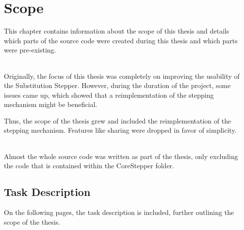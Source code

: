 \chapter{Scope}

This chapter contains information about the scope of this thesis
and details which parts of the source code were created during this thesis and which parts were pre-existing.


\ \\
Originally, the focus of this thesis was completely on improving the usability of the Substitution Stepper.
However, during the duration of the project, some issues came up,
which showed that a reimplementation of the stepping mechanism might be beneficial.

Thus, the scope of the thesis grew and included the reimplementation of the stepping mechanism.
Features like sharing were dropped in favor of simplicity.

\ \\
Almost the whole source code was written as part of the thesis,
only excluding the code that is contained within the CoreStepper folder.

\section{Task Description}
On the following pages, the task description is included,
further outlining the scope of the thesis.
